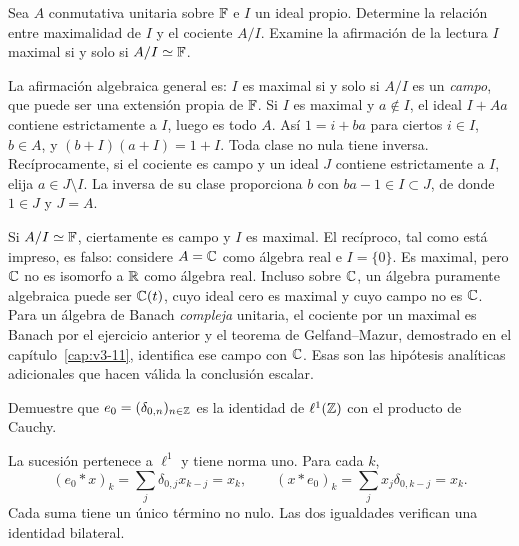\begin{ejercicio}\label{ej:v3-l20-3}
Sea $A$ conmutativa unitaria sobre $\mathbb F$ e $I$ un ideal propio. Determine la relación entre maximalidad de $I$ y el cociente $A/I$. Examine la afirmación de la lectura $I$ maximal si y solo si $A/I\simeq\mathbb F$.
\end{ejercicio}
\begin{solucion}
La afirmación algebraica general es: $I$ es maximal si y solo si $A/I$ es un \emph{campo}, que puede ser una extensión propia de $\mathbb F$. Si $I$ es maximal y $a\notin I$, el ideal $I+Aa$ contiene estrictamente a $I$, luego es todo $A$. Así $1=i+ba$ para ciertos $i\in I$, $b\in A$, y $(b+I)(a+I)=1+I$. Toda clase no nula tiene inversa. Recíprocamente, si el cociente es campo y un ideal $J$ contiene estrictamente a $I$, elija $a\in J\setminus I$. La inversa de su clase proporciona $b$ con $ba-1\in I\subset J$, de donde $1\in J$ y $J=A$.

Si $A/I\simeq\mathbb F$, ciertamente es campo y $I$ es maximal. El recíproco, tal como está impreso, es falso: considere $A=\mathbb C$ como álgebra real e $I=\{0\}$. Es maximal, pero $\mathbb C$ no es isomorfo a $\mathbb R$ como álgebra real. Incluso sobre $\mathbb C$, un álgebra puramente algebraica puede ser $\mathbb C(t)$, cuyo ideal cero es maximal y cuyo campo no es $\mathbb C$. Para un álgebra de Banach \emph{compleja} unitaria, el cociente por un maximal es Banach por el ejercicio anterior y el teorema de Gelfand--Mazur, demostrado en el capítulo~\ref{cap:v3-11}, identifica ese campo con $\mathbb C$. Esas son las hipótesis analíticas adicionales que hacen válida la conclusión escalar.
\end{solucion}

\begin{ejercicio}\label{ej:v3-l20-4}
Demuestre que $e_0=(\delta_{0,n})_{n\in\mathbb Z}$ es la identidad de $\ell^1(\mathbb Z)$ con el producto de Cauchy.
\end{ejercicio}
\begin{solucion}
La sucesión pertenece a $\ell^1$ y tiene norma uno. Para cada $k$,
\[
 (e_0*x)_k=\sum_j\delta_{0,j}x_{k-j}=x_k,
 \qquad (x*e_0)_k=\sum_jx_j\delta_{0,k-j}=x_k.
\]
Cada suma tiene un único término no nulo. Las dos igualdades verifican una identidad bilateral.
\end{solucion}

